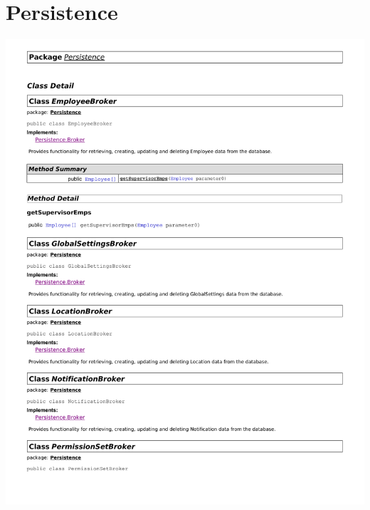 \documentclass[letterpaper,12pt]{report}
\begin{document}
\section{Persistence}
\includegraphics[scale=0.9,trim=10mm 30mm 25mm 35mm]{externals/dp1.pdf}
\newpage
\end{document}
